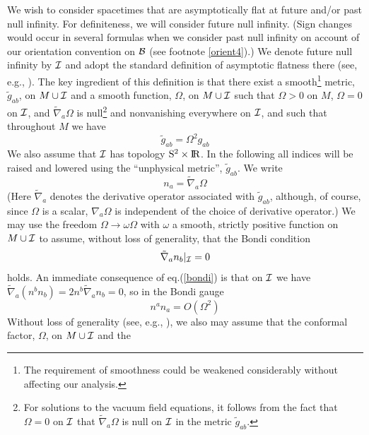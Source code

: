 We wish to consider spacetimes that are asymptotically flat at future
and/or past null infinity. For definiteness, we will consider future
null infinity. (Sign changes would occur in several formulas when we
consider past null infinity on account of our orientation convention
on $\cal B$ (see footnote \ref{orient4}).) We denote future null
infinity by ${\cal I}$ and adopt the standard definition of asymptotic
flatness there (see, e.g., \cite{w}). The key ingredient of this
definition is that there exist a smooth\footnote{The requirement of
smoothness could be weakened considerably without affecting our
analysis.}  metric, $\tilde{g}_{ab}$, on $M \cup {\cal I}$ and a
smooth function, $\Omega$, on $M \cup {\cal I}$ such that $\Omega > 0$
on $M$, $\Omega = 0$ on ${\cal I}$, and $\tilde{\nabla}_a \Omega$ is
null\footnote{For solutions to the vacuum field equations, it follows
from the fact that $\Omega = 0$ on ${\cal I}$ that $\tilde{\nabla}_a
\Omega$ is null on ${\cal I}$ in the metric $\tilde{g}_{ab}$.} and
nonvanishing everywhere on ${\cal I}$, and such that throughout $M$ we have
\begin{equation}
\tilde{g}_{ab} = \Omega^2 g_{ab}
\label{gtilde}
\end{equation}
We also assume that $\cal I$ has topology ${\rm S}^2 \times {\rm I} \!
{\rm R}$.  In the following all indices will be raised and lowered
using the ``unphysical metric'', $\tilde{g}_{ab}$.  We write
\begin{equation}
n_a = \tilde{\nabla}_a \Omega
\label{n}
\end{equation}
(Here $\tilde{\nabla}_a$ denotes the derivative operator associated
with $\tilde{g}_{ab}$, although, of course, since $\Omega$ is a
scalar, $\nabla_a \Omega$ is independent of the choice of derivative
operator.) We may use the freedom $\Omega \rightarrow \omega \Omega$
with $\omega$ a smooth, strictly positive function on $M \cup {\cal
I}$ to assume, without loss of generality, that the Bondi condition
\begin{equation}
\tilde{\nabla}_a n_b |_{\cal I} = 0
\label{bondi}
\end{equation}
holds. An immediate consequence of eq.(\ref{bondi}) is that on ${\cal
I}$ we have $\tilde{\nabla}_a (n^b n_b) = 2 n^b \tilde{\nabla}_a n_b =
0$, so in the Bondi gauge
\begin{equation}
n^a n_a = O(\Omega^2)
\label{n2}
\end{equation}
Without loss of generality (see, e.g., \cite{gw}), we also may assume
that the conformal factor, $\Omega$, on $M \cup {\cal I}$ and the

